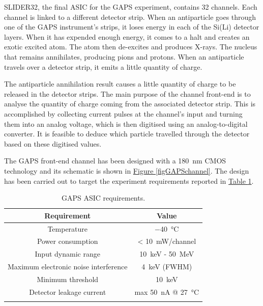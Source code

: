 SLIDER32, the final ASIC for the GAPS experiment, contains 32 channels. Each channel is linked to a different detector strip. When an antiparticle goes through one of the GAPS instrument's strips, it loses energy in each of the Si(Li) detector layers. When it has expended enough energy, it comes to a halt and creates an exotic excited atom. The atom then de-excites and produces X-rays. The nucleus that remains annihilates, producing pions and protons. When an antiparticle travels over a detector strip, it emits a little quantity of charge.

\par
The antiparticle annihilation result causes a little quantity of charge to be released in the detector strips. The main purpose of the channel front-end is to analyse the quantity of charge coming from the associated detector strip. This is accomplished by collecting current pulses at the channel's input and turning them into an analog voltage, which is then digitised using an analog-to-digital converter. It is feasible to deduce which particle travelled through the detector based on these digitised values.

\par
The GAPS front-end channel has been designed with a \SI{180}{\nano\meter} CMOS technology and its schematic is shown in \hyperref[figGAPSchannel]{Figure \ref{figGAPSchannel}}. The design has been carried out to target the experiment requirements reported in \hyperref[tabGAPSrequirements]{Table \ref{tabGAPSrequirements}}.

\begin{table}[ht]
    \centering
    \begin{tabular}{c c} 
         \Xhline{2\arrayrulewidth}
         Requirement & Value \T\B \\
         \hline
         Temperature & \SI{-40}{\celsius} \T\B \\
         Power consumption & < \SI{10}{\milli\watt}/channel \T\B \\
         Input dynamic range & \SI{10}{\kilo\electronvolt} - \SI{50}{\mega\electronvolt} \T\B \\
         Maximum electronic noise interference & \SI{4}{\kilo\electronvolt} (FWHM) \T\B \\
         Minimum threshold & \SI{10}{\kilo\electronvolt} \T\B \\
         Detector leakage current & max \SI{50}{\nano\ampere} @ \SI{27}{\celsius} \T\B \\
         \Xhline{2\arrayrulewidth}
    \end{tabular}
    \caption{GAPS ASIC requirements.}
    \label{tabGAPSrequirements}
\end{table}

